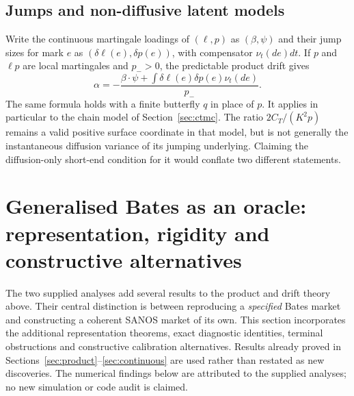 \documentclass[11pt,a4paper]{article}
\numberwithin{equation}{section}
\theoremstyle{definition}\newtheorem{definition}[theorem]{Definition}
\theoremstyle{remark}\newtheorem{remark}[theorem]{Remark}
\begin{document}
\subsection{Jumps and non-diffusive latent models}
Write the continuous martingale loadings of $(\ell,p)$ as $(\beta,\psi)$ and their jump sizes for mark $e$ as $(\delta\ell(e),\delta p(e))$, with compensator $\nu_t(de)dt$. If $p$ and $\ell p$ are local martingales and $p_->0$, the predictable product drift gives
\begin{equation}
 \boxed{\quad
 \alpha=-\frac{\beta\cdot\psi+\int\delta\ell(e)\delta p(e)\nu_t(de)}{p_-}.
 \quad}
 \label{eq:jump-drift}
\end{equation}
The same formula holds with a finite butterfly $q$ in place of $p$. It applies in particular to the chain model of Section~\ref{sec:ctmc}. The ratio $2C_T/(K^2p)$ remains a valid positive surface coordinate in that model, but is not generally the instantaneous diffusion variance of its jumping underlying. Claiming the diffusion-only short-end condition for it would conflate two different statements.

\section{Generalised Bates as an oracle: representation, rigidity and constructive alternatives}
\label{sec:bates}

The two supplied analyses \cite{BatesCompatibility,FiniteSANOS} add several results to the product and drift theory above. Their central distinction is between reproducing a \emph{specified} Bates market and constructing a coherent SANOS market of its own. This section incorporates the additional representation theorems, exact diagnostic identities, terminal obstructions and constructive calibration alternatives. Results already proved in Sections~\ref{sec:product}--\ref{sec:continuous} are used rather than restated as new discoveries. The numerical findings below are attributed to the supplied analyses; no new simulation or code audit is claimed.
\end{document}
